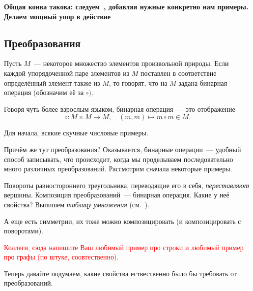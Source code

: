 	\bf{Общая конва такова:} следуем~\cite{alekseev}, добавляя нужные конкретно нам примеры. Делаем мощный упор в действие 
	
	\subsection{Преобразования}

	\begin{definition} 
		Пусть $M$~--- некоторое множество элементов произвольной природы. Если каждой упорядоченной паре элементов из $M$ поставлен в соответствие определённый элемент также из $M$, то говорят, что на $M$ задана бинарная операция (обозначим её за $\circ)$.

		Говоря чуть более взрослым языком, бинарная операция~--- это отображение 
		\[
			\circ\colon M \times M \to M, \quad (m, m) \mapsto m \circ m \in M.
		\]
	\end{definition}

	\begin{example}
		Для начала, всякие скучные числовые примеры. 
	\end{example}

	Причём же тут преобразования? Оказывается, бинарные операции~--- удобный способ записывать, что происходит, когда мы проделываем последовательно много различных преобразований.  Рассмотрим сначала некоторые примеры. 

	\begin{example}
		Повороты равностороннего треугольника, переводящие его в себя, \emph{переставляют} вершины. Композиция преобразований~--- бинарная операция. Какие у неё свойства? Выпишем \emph{таблицу умножения} (см.~\cite[пример 1]{alekseev}).

		А еще есть симметрии, их тоже можно композицировать (и композицировать с поворотами).  
	\end{example}

	\textcolor{red}{Коллеги, сюда напишите Ваш любимый пример про строки и любимый пример про графы (по штуке, соовтественно).}

	Теперь давайте подумаем, какие свойства ествественно было бы требовать от преобразований.

